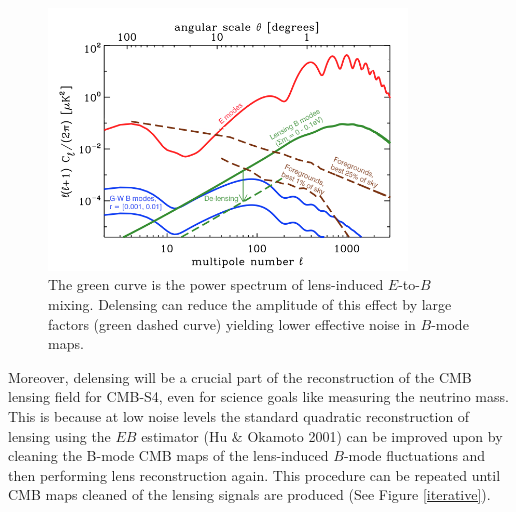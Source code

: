 \begin{figure}[h]
\centering
\includegraphics[width=0.85\textwidth]{CMBLensing/Delensing.png}
\caption{The green curve is the power spectrum of lens-induced $E$-to-$B$ mixing.  Delensing can reduce the amplitude of this effect by large factors (green dashed curve) yielding lower effective noise in $B$-mode maps.}
\label{snowmssDelens}
\end{figure}

Moreover, delensing will be a crucial part of the reconstruction of the CMB lensing field for CMB-S4, even for science goals like measuring the neutrino mass.  This is because at low noise levels the standard quadratic reconstruction of lensing using the $EB$ estimator (Hu \& Okamoto 2001) can be improved upon by cleaning the B-mode CMB maps of the lens-induced $B$-mode fluctuations and then performing lens reconstruction again.  This procedure can be repeated until CMB maps cleaned of the lensing signals are produced (See Figure \ref{iterative}).  


